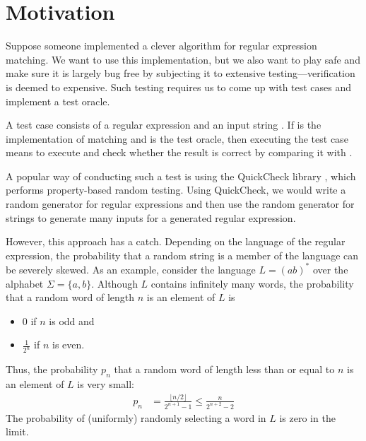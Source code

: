 \section{Motivation}
\label{sec:motivation}

Suppose someone implemented a clever algorithm for
regular expression matching. 
We want to use this implementation, but we also want to play safe and
make sure it is largely bug free by subjecting it to extensive
testing---verification is deemed to expensive.
Such testing requires us to come up with test cases and
implement a test oracle.


A test case consists of a regular expression  and an input
string . If  is the implementation of matching
and  is the test oracle, then
executing the test case means to execute  and check whether the result is correct by comparing it with
. 

A popular way of conducting such a test is using the QuickCheck library
\cite{DBLP:conf/icfp/ClaessenH00}, which performs property-based random testing. Using
QuickCheck, we would write a random generator for regular expressions
and then use the random generator for strings to generate many inputs for a
generated regular expression.

However, this approach has a
catch. Depending on the language of the regular expression, the
probability that a random string is a member of the language can be
severely skewed. As an example, consider the language $L = (ab)^*$ over the
alphabet $\Sigma = \{a, b\}$. Although $L$ contains infinitely many
words, the probability that a random word of
length $n$ is an element of $L$ is
\begin{itemize}
\item $0$ if $n$ is odd and
\item $\frac{1}{2^n}$ if $n$ is even.
\end{itemize}
Thus, the probability $p_n$ that a random word of length less than or equal to
$n$ is an element of $L$ is very small:
\begin{align*}
  p_n &= \frac{\lfloor n/2 \rfloor}{2^{n+1} - 1}
        \le \frac{n}{2^{n+2} - 2}
\end{align*}
The probability of (uniformly) randomly
selecting a word in $L$ is zero in the limit.

